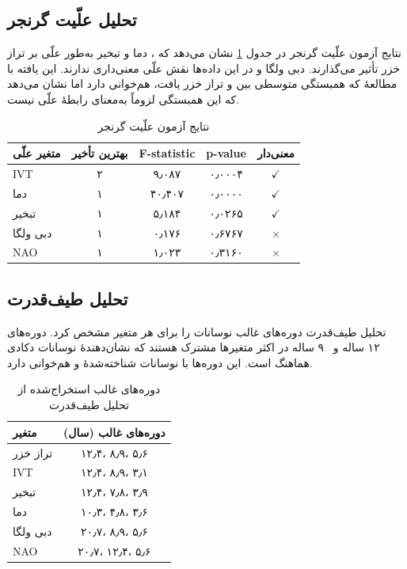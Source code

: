 \documentclass[12pt,a4paper]{article}
\begin{document}
\subsection{تحلیل علّیت گرنجر}
نتایج آزمون علّیت گرنجر در جدول \ref{tab:granger} نشان می‌دهد که ، دما و تبخیر به‌طور علّی بر تراز خزر تأثیر می‌گذارند. دبی ولگا و  در این داده‌ها نقش علّی معنی‌داری ندارند. این یافته با مطالعهٔ \cite{impact2025} که همبستگی متوسطی بین  و تراز خزر یافت، هم‌خوانی دارد اما نشان می‌دهد که این همبستگی لزوماً به‌معنای رابطهٔ علّی نیست.

\begin{table}[H]
\centering
\caption{نتایج آزمون علّیت گرنجر}
\label{tab:granger}
\begin{tabular}{lcccc}
\toprule
\textbf{متغیر علّی} & \textbf{بهترین تأخیر} & \textbf{F-statistic} & \textbf{p-value} & \textbf{معنی‌دار} \\
\midrule
IVT & ۲ & ۹٫۰۸۷ & ۰٫۰۰۰۴ & $\checkmark$ \\
دما & ۱ & ۴۰٫۴۰۷ & ۰٫۰۰۰۰ & $\checkmark$ \\
تبخیر & ۱ & ۵٫۱۸۴ & ۰٫۰۲۶۵ & $\checkmark$ \\
دبی ولگا & ۱ & ۰٫۱۷۶ & ۰٫۶۷۶۷ & $\times$ \\
NAO & ۱ & ۱٫۰۲۳ & ۰٫۳۱۶۰ & $\times$ \\
\bottomrule
\end{tabular}
\end{table}

\subsection{تحلیل طیف‌قدرت}
تحلیل طیف‌قدرت دوره‌های غالب نوسانات را برای هر متغیر مشخص کرد. دوره‌های ~۱۲ ساله و ~۹ ساله در اکثر متغیرها مشترک هستند که نشان‌دهندهٔ نوسانات دکادی هماهنگ است. این دوره‌ها با نوسانات شناخته‌شدهٔ  و  هم‌خوانی دارد.

\begin{table}[H]
\centering
\caption{دوره‌های غالب استخراج‌شده از تحلیل طیف‌قدرت}
\label{tab:spectral}
\begin{tabular}{lc}
\toprule
\textbf{متغیر} & \textbf{دوره‌های غالب (سال)} \\
\midrule
تراز خزر & ۱۲٫۴، ۸٫۹، ۵٫۶ \\
IVT & ۱۲٫۴، ۸٫۹، ۳٫۱ \\
تبخیر & ۱۲٫۴، ۷٫۸، ۳٫۹ \\
دما & ۱۰٫۳، ۴٫۸، ۳٫۶ \\
دبی ولگا & ۲۰٫۷، ۸٫۹، ۵٫۶ \\
NAO & ۲۰٫۷، ۱۲٫۴، ۵٫۶ \\
\bottomrule
\end{tabular}
\end{table}
\end{document}
